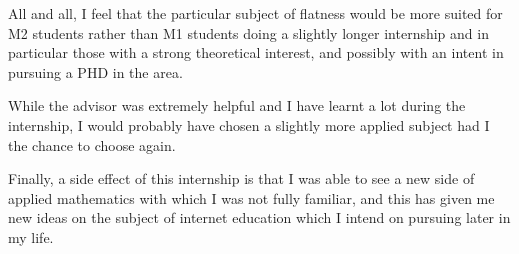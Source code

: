 \documentclass[12pt]{article}
\begin{document}
All and all, I feel that the particular subject of flatness would be more suited for M2 students rather than M1 students doing a slightly
longer internship and in particular those with a strong theoretical interest, and possibly with an intent in pursuing a PHD in the area.

While the advisor was extremely helpful and I have learnt a lot during
the internship, I would probably have chosen a slightly more applied subject had I the chance to choose again.

Finally, a side effect of this internship is that I was able to see
a new side of applied mathematics with which I was not fully familiar,
and this has given me new ideas on the subject of internet education
which I intend on pursuing later in my life.

\newpage

\end{document}

